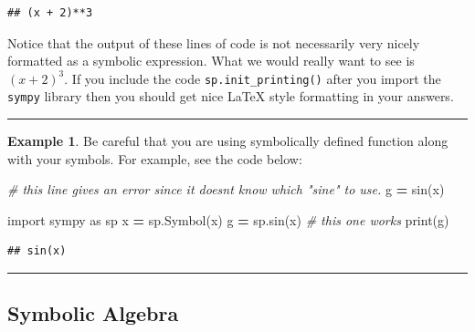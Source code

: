 \documentclass[
]{book}
\newenvironment{Shaded}{\begin{snugshade}}{\end{snugshade}}
\newcommand{\BuiltInTok}[1]{#1}
\newcommand{\CommentTok}[1]{\textcolor[rgb]{0.56,0.35,0.01}{\textit{#1}}}
\newcommand{\ImportTok}[1]{#1}
\newcommand{\NormalTok}[1]{#1}
\newcommand{\OperatorTok}[1]{\textcolor[rgb]{0.81,0.36,0.00}{\textbf{#1}}}
\newcommand{\StringTok}[1]{\textcolor[rgb]{0.31,0.60,0.02}{#1}}
\theoremstyle{definition}
\theoremstyle{definition}
\newtheorem{example}{Example}[chapter]
\theoremstyle{definition}
\theoremstyle{remark}
\begin{document}
\begin{verbatim}
## (x + 2)**3
\end{verbatim}

Notice that the output of these lines of code is not necessarily very nicely formatted as a symbolic expression. What we would really want to see is \(\displaystyle (x+2)^3\). If you include the code \texttt{sp.init\_printing()} after you import the \texttt{sympy} library then you should get nice LaTeX style formatting in your answers.

\begin{center}\rule{0.5\linewidth}{0.5pt}\end{center}

\begin{example}
\protect\hypertarget{exm:unnamed-chunk-776}{}{\label{exm:unnamed-chunk-776} }Be careful that you are using symbolically defined function along with your symbols. For example, see the code below:
\end{example}

\begin{Shaded}
\begin{Highlighting}[]
\CommentTok{\# this line gives an error since it doesn\textquotesingle{}t know which "sine" to use.}
\NormalTok{g }\OperatorTok{=}\NormalTok{ sin(x) }
\end{Highlighting}
\end{Shaded}

\begin{Shaded}
\begin{Highlighting}[]
\ImportTok{import}\NormalTok{ sympy }\ImportTok{as}\NormalTok{ sp}
\NormalTok{x }\OperatorTok{=}\NormalTok{ sp.Symbol(}\StringTok{\textquotesingle{}x\textquotesingle{}}\NormalTok{)}
\NormalTok{g }\OperatorTok{=}\NormalTok{ sp.sin(x) }\CommentTok{\# this one works}
\BuiltInTok{print}\NormalTok{(g)}
\end{Highlighting}
\end{Shaded}

\begin{verbatim}
## sin(x)
\end{verbatim}

\begin{center}\rule{0.5\linewidth}{0.5pt}\end{center}

\hypertarget{symbolic-algebra}{%
\subsection{Symbolic Algebra}\label{symbolic-algebra}}
\end{document}
